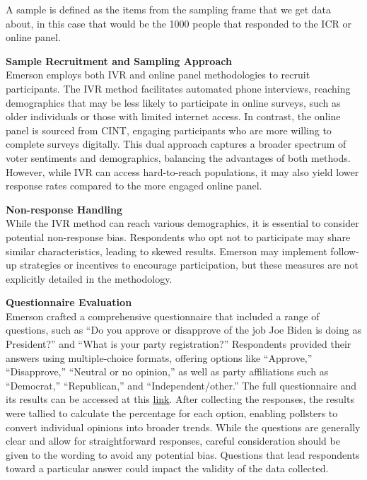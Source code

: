 \documentclass[
  letterpaper,
  DIV=11,
  numbers=noendperiod]{scrartcl}
\begin{document}
A sample is defined as the items from the sampling frame that we get
data about, in this case that would be the 1000 people that responded to
the ICR or online panel.

\textbf{Sample Recruitment and Sampling Approach}\\
Emerson employs both IVR and online panel methodologies to recruit
participants. The IVR method facilitates automated phone interviews,
reaching demographics that may be less likely to participate in online
surveys, such as older individuals or those with limited internet
access. In contrast, the online panel is sourced from CINT, engaging
participants who are more willing to complete surveys digitally. This
dual approach captures a broader spectrum of voter sentiments and
demographics, balancing the advantages of both methods. However, while
IVR can access hard-to-reach populations, it may also yield lower
response rates compared to the more engaged online panel.

\textbf{Non-response Handling}\\
While the IVR method can reach various demographics, it is essential to
consider potential non-response bias. Respondents who opt not to
participate may share similar characteristics, leading to skewed
results. Emerson may implement follow-up strategies or incentives to
encourage participation, but these measures are not explicitly detailed
in the methodology.

\textbf{Questionnaire Evaluation}\\
Emerson crafted a comprehensive questionnaire that included a range of
questions, such as ``Do you approve or disapprove of the job Joe Biden
is doing as President?'' and ``What is your party registration?''
Respondents provided their answers using multiple-choice formats,
offering options like ``Approve,'' ``Disapprove,'' ``Neutral or no
opinion,'' as well as party affiliations such as ``Democrat,''
``Republican,'' and ``Independent/other.'' The full questionnaire and
its results can be accessed at this
\href{https://docs.google.com/spreadsheets/d/1QxGDC4nSP1dS6N7N1aXBxnXkRPyfw2As/edit?gid=1716322793\#gid=1716322793}{link}.
After collecting the responses, the results were tallied to calculate
the percentage for each option, enabling pollsters to convert individual
opinions into broader trends. While the questions are generally clear
and allow for straightforward responses, careful consideration should be
given to the wording to avoid any potential bias. Questions that lead
respondents toward a particular answer could impact the validity of the
data collected.
\end{document}
